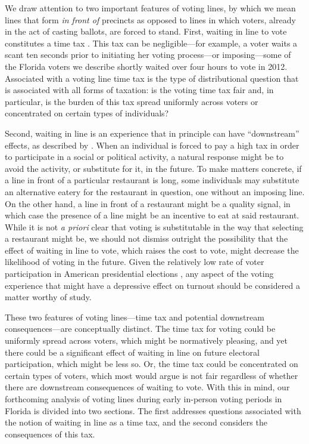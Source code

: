 \documentclass[12pt,titlepage]{article}
\begin{document}
We draw attention to two important features of voting lines, by which
we mean lines that form \emph{in front of} precincts as opposed to
lines in which voters, already in the act of casting ballots, are
forced to stand.  First, waiting in line to vote constitutes a time
tax \citep{mukherjee:timetax}.  This tax can be negligible---for
example, a voter waits a scant ten seconds prior to initiating her
voting process---or imposing---some of the Florida voters we describe
shortly waited over four hours to vote in 2012. Associated with a
voting line time tax is the type of distributional question that is
associated with all forms of taxation: is the voting time tax fair
and, in particular, is the burden of this tax spread uniformly across
voters or concentrated on certain types of individuals?

Second, waiting in line is an experience that in principle can have
``downstream'' effects, as described by
\citet{pettigrew:longlinesminorityprecincts}. When an individual is
forced to pay a high tax in order to participate in a social or
political activity, a natural response might be to avoid the activity,
or substitute for it, in the future. To make matters concrete, if a
line in front of a particular restaurant is long, some individuals may
substitute an alternative eatery for the restaurant in question, one
without an imposing line.  On the other hand, a line in front of a
restaurant might be a quality signal, in which case the presence of a
line might be an incentive to eat at said restaurant.  While it is not
\emph{a priori} clear that voting is substitutable in the way that
selecting a restaurant might be, we should not dismiss outright the
possibility that the effect of waiting in line to vote, which raises
the cost to vote, might decrease the likelihood of voting in the
future.  Given the relatively low rate of voter participation in
American presidential elections \citep{IDEA:turnout}, any aspect of
the voting experience that might have a depressive effect on turnout
should be considered a matter worthy of study.


These two features of voting lines---time tax and potential downstream
consequences---are conceptually distinct. The time tax for voting
could be uniformly spread across voters, which might be normatively
pleasing, and yet there could be a significant effect of waiting in
line on future electoral participation, which might be less so. Or,
the time tax could be concentrated on certain types of voters, which
most would argue is not fair regardless of whether there are
downstream consequences of waiting to vote. With this in mind, our
forthcoming analysis of voting lines during early in-person voting
periods in Florida is divided into two sections. The first addresses
questions associated with the notion of waiting in line as a time tax,
and the second considers the consequences of this tax.
\end{document}
